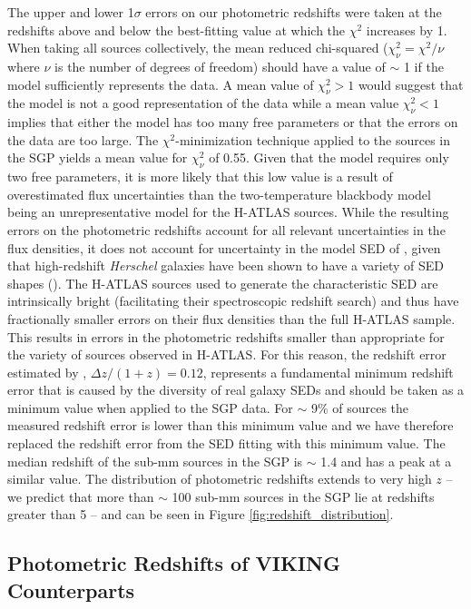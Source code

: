 The upper and lower 1$\sigma$ errors on our photometric redshifts were taken at the redshifts above and below the best-fitting value at which the $\chi^2$ increases by 1. When taking all sources collectively, the mean reduced chi-squared ($\chi_\nu^2 = \chi^2/\nu$ where $\nu$ is the number of degrees of freedom) should have a value of $\sim$ 1 if the model sufficiently represents the data. A mean value of $\chi_\nu^2 > 1$ would suggest that the model is not a good representation of the data while a mean value $\chi_\nu^2 < 1$ implies that either the model has too many free parameters or that the errors on the data are too large. The $\chi^2$-minimization technique applied to the sources in the SGP yields a mean value for $\chi_\nu^2$ of 0.55. Given that the model requires only two free parameters, it is more likely that this low value is a result of overestimated flux uncertainties than the two-temperature blackbody model being an unrepresentative model for the H-ATLAS sources. While the resulting errors on the photometric redshifts account for all relevant uncertainties in the flux densities, it does not account for uncertainty in the model SED of \citealt{Pearson_2013}, given that high-redshift \textit{Herschel} galaxies have been shown to have a variety of SED shapes (\citealt{Bakx_2018}). The H-ATLAS sources used to generate the characteristic SED are intrinsically bright (facilitating their spectroscopic redshift search) and thus have fractionally smaller errors on their flux densities than the full H-ATLAS sample. This results in errors in the photometric redshifts smaller than appropriate for the variety of sources observed in H-ATLAS. For this reason, the redshift error estimated by \citealt{Pearson_2013}, $\Delta z/(1+z) = 0.12$, represents a fundamental minimum redshift error that is caused by the diversity of real galaxy SEDs and should be taken as a minimum value when applied to the SGP data. For $\sim$ 9\% of sources the measured redshift error is lower than this minimum value and we have therefore replaced the redshift error from the SED fitting with this minimum value. The median redshift of the sub-mm sources in the SGP is $\sim$ 1.4 and has a peak at a similar value. The distribution of photometric redshifts extends to very high $z$ -- we predict that more than $\sim$ 100 sub-mm sources in the SGP lie at redshifts greater than 5 -- and can be seen in Figure \ref{fig:redshift_distribution}.

\subsection{Photometric Redshifts of VIKING Counterparts}
\label{sec:phot_z_VIKING}

